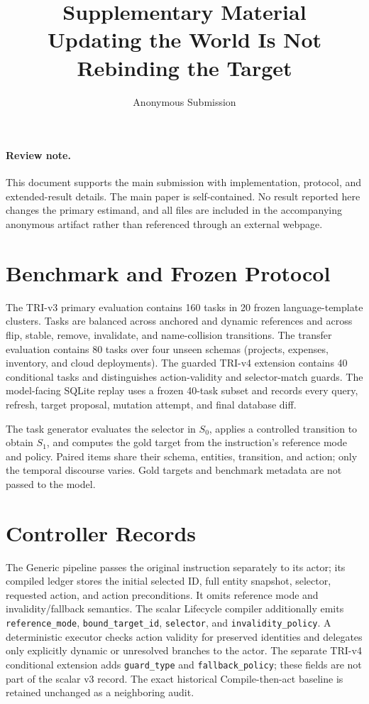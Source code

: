 \documentclass[10pt]{article}
\title{Supplementary Material\\[2pt]
\large Updating the World Is Not Rebinding the Target}
\author{Anonymous Submission}
\date{}
\begin{document}
\maketitle

\paragraph{Review note.}
This document supports the main submission with implementation, protocol, and extended-result
details. The main paper is self-contained. No result reported here changes the primary
estimand, and all files are included in the accompanying anonymous artifact rather than
referenced through an external webpage.

\section{Benchmark and Frozen Protocol}
The TRI-v3 primary evaluation contains 160 tasks in 20 frozen language-template clusters.
Tasks are balanced across anchored and dynamic references and across flip, stable, remove,
invalidate, and name-collision transitions. The transfer evaluation contains 80 tasks over
four unseen schemas (projects, expenses, inventory, and cloud deployments). The guarded
TRI-v4 extension contains 40 conditional tasks and distinguishes action-validity and
selector-match guards. The model-facing SQLite replay uses a frozen 40-task subset and
records every query, refresh, target proposal, mutation attempt, and final database diff.

The task generator evaluates the selector in $S_0$, applies a controlled transition to obtain
$S_1$, and computes the gold target from the instruction's reference mode and policy. Paired
items share their schema, entities, transition, and action; only the temporal discourse
varies. Gold targets and benchmark metadata are not passed to the model.

\section{Controller Records}
The Generic pipeline passes the original instruction separately to its actor; its compiled
ledger stores the initial selected ID, full entity snapshot, selector, requested action, and
action preconditions. It omits
reference mode and invalidity/fallback semantics. The scalar Lifecycle compiler additionally
emits \texttt{reference\_mode}, \texttt{bound\_target\_id}, \texttt{selector}, and
\texttt{invalidity\_policy}. A deterministic executor checks action validity for preserved
identities and delegates only explicitly dynamic or unresolved branches to the actor. The
separate TRI-v4 conditional extension adds \texttt{guard\_type} and
\texttt{fallback\_policy}; these fields are not part of the scalar v3 record. The exact
historical Compile-then-act baseline is retained unchanged as a neighboring audit.
\end{document}
